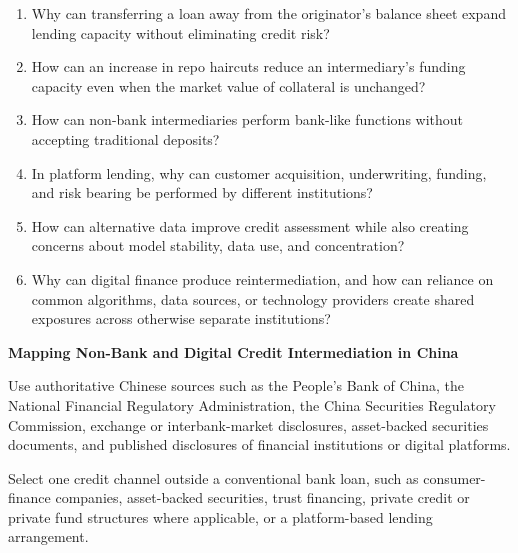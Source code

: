 

\begin{enumerate}

\item Why can transferring a loan away from the originator's balance sheet expand lending capacity without eliminating credit risk?

\item How can an increase in repo haircuts reduce an intermediary's funding capacity even when the market value of collateral is unchanged?

\item How can non-bank intermediaries perform bank-like functions without accepting traditional deposits?

\item In platform lending, why can customer acquisition, underwriting, funding, and risk bearing be performed by different institutions?

\item How can alternative data improve credit assessment while also creating concerns about model stability, data use, and concentration?

\item Why can digital finance produce reintermediation, and how can reliance on common algorithms, data sources, or technology providers create shared exposures across otherwise separate institutions?

\end{enumerate}



\textbf{Mapping Non-Bank and Digital Credit Intermediation in China}

Use authoritative Chinese sources such as the People's Bank of China, the National Financial Regulatory Administration, the China Securities Regulatory Commission, exchange or interbank-market disclosures, asset-backed securities documents, and published disclosures of financial institutions or digital platforms.

Select one credit channel outside a conventional bank loan, such as consumer-finance companies, asset-backed securities, trust financing, private credit or private fund structures where applicable, or a platform-based lending arrangement.

